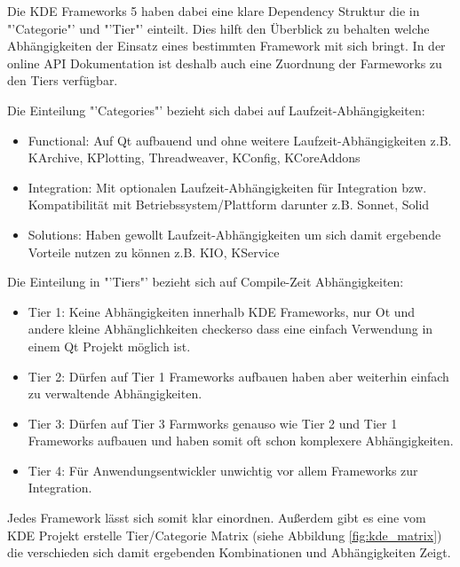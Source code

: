 \documentclass[10pt,a4paper,twocolumn]{article}
\begin{document}
Die KDE Frameworks 5 haben dabei eine klare Dependency Struktur die in "'Categorie"' und "'Tier"' einteilt. Dies hilft den Überblick zu behalten welche Abhängigkeiten der Einsatz eines bestimmten Framework mit sich bringt. In der online API Dokumentation ist deshalb auch eine Zuordnung der Farmeworks zu den Tiers verfügbar.

Die Einteilung "'Categories"' bezieht sich dabei auf Laufzeit-Abhängigkeiten:
\begin{itemize}
\setlength\itemsep{0em}
\item Functional: Auf Qt aufbauend und ohne weitere Laufzeit-Abhängigkeiten z.B. KArchive, KPlotting, Threadweaver, KConfig, KCoreAddons

\item Integration: Mit optionalen Laufzeit-Abhängigkeiten für Integration bzw. Kompatibilität mit Betriebssystem/Plattform darunter z.B. Sonnet, Solid

\item Solutions: Haben gewollt Laufzeit-Abhängigkeiten um sich damit ergebende Vorteile nutzen zu können z.B. KIO, KService
\end{itemize}

Die Einteilung in "'Tiers"' bezieht sich auf Compile-Zeit Abhängigkeiten:
\begin{itemize}
\setlength\itemsep{0em}
\item Tier 1: Keine Abhängigkeiten innerhalb KDE Frameworks, nur Ot und andere kleine Abhänglichkeiten  checkerso dass eine einfach Verwendung in einem Qt Projekt möglich ist. 

\item Tier 2: Dürfen auf Tier 1 Frameworks aufbauen haben aber weiterhin einfach zu verwaltende Abhängigkeiten.

\item Tier 3: Dürfen auf Tier 3 Farmworks genauso wie Tier 2 und Tier 1 Frameworks aufbauen und haben somit oft schon komplexere Abhängigkeiten.

\item Tier 4: Für Anwendungsentwickler unwichtig vor allem Frameworks zur Integration. 
\end{itemize}

Jedes Framework lässt sich somit klar einordnen. Außerdem gibt es eine vom KDE Projekt erstelle Tier/Categorie Matrix (siehe Abbildung \ref{fig:kde_matrix}) die verschieden sich damit ergebenden Kombinationen und Abhängigkeiten Zeigt.
\end{document}
